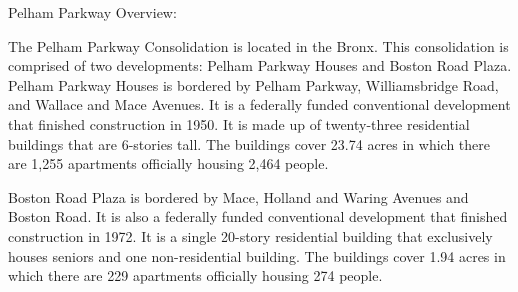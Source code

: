 Pelham Parkway Overview:  

The Pelham Parkway Consolidation is located in the Bronx. This consolidation is comprised of two developments: Pelham Parkway Houses and Boston Road Plaza. Pelham Parkway Houses is bordered by Pelham Parkway, Williamsbridge Road, and Wallace and Mace Avenues. It is a federally funded conventional development that finished construction in 1950. It is made up of twenty-three residential buildings that are 6-stories tall. The buildings cover 23.74 acres in which there are 1,255 apartments officially housing 2,464 people.   

  

Boston Road Plaza is bordered by Mace, Holland and Waring Avenues and Boston Road. It is also a federally funded conventional development that finished construction in 1972. It is a single 20-story residential building that exclusively houses seniors and one non-residential building. The buildings cover 1.94 acres in which there are 229 apartments officially housing 274 people.   

 